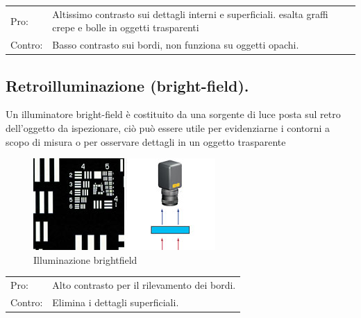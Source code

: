 \begin{centering}

\begin{tabularx}{\textwidth}{l p{}}
Pro: &  Altissimo contrasto sui dettagli interni e superficiali. esalta graffi crepe e bolle in oggetti trasparenti \\
Contro: &  Basso contrasto sui bordi, non funziona su oggetti opachi.\\
\end{tabularx}
\end{centering}

\subsection{Retroilluminazione (bright-field).}
Un illuminatore bright-field è costituito da una sorgente di luce posta sul retro dell'oggetto da ispezionare,
ciò può essere utile per evidenziarne i contorni a scopo di misura o per osservare dettagli in un oggetto
trasparente 

\begin{figure}[!h]
\centering
\includegraphics[width=.3\textwidth]{img/illuminazione-brightfield.jpg}
\caption{Illuminazione brightfield}\label{fig:illuminazione-brightfield}
\end{figure}

\begin{centering}

\begin{tabularx}{\textwidth}{l p{}}
Pro: &  Alto contrasto per il rilevamento dei bordi. \\
Contro: &  Elimina i dettagli superficiali.\\
\end{tabularx}
\end{centering}

